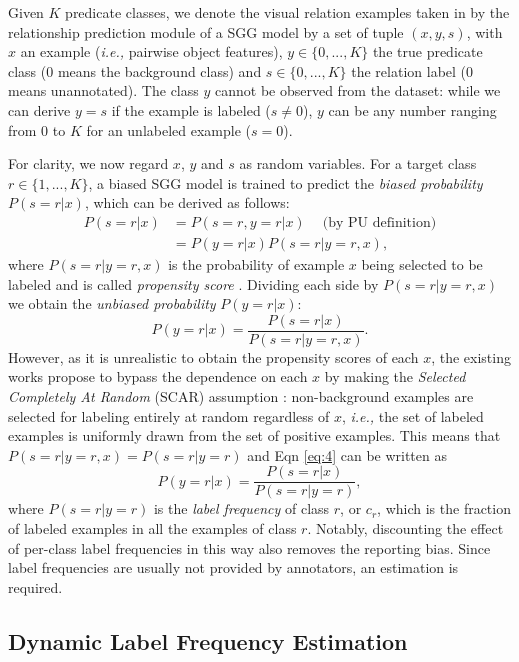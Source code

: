 \documentclass[sigconf]{acmart}
\begin{document}
Given $K$ predicate classes, we denote the visual relation examples taken in by the relationship prediction module of a SGG model by a set of tuple $(x, y, s)$, with $x$ an example (\emph{i.e.,} pairwise object features), $y \in \{0,...,K\}$ the true predicate class (0 means the background class) and $s \in \{0,...,K\}$ the relation label (0 means unannotated).
The class $y$ cannot be observed from the dataset: while we can derive $y=s$ if the example is labeled ($s \neq 0$), $y$ can be any number ranging from $0$ to $K$ for an unlabeled example ($s=0$).

For clarity, we now regard $x$, $y$ and $s$ as random variables.
For a target class $r \in \{1,...,K\}$, a biased SGG model is trained to predict the \textit{biased probability} $P(s=r|x)$, which can be derived as follows:
\begin{align}
    P(s=r|x) &= P(s=r, y=r|x) \quad \ \text{(by PU definition)} \\
             &= P(y=r|x)P(s=r|y=r,x), 
\end{align}
where $P(s=r|y=r,x)$ is the probability of example $x$ being selected to be labeled and is called \textit{propensity score} \cite{bekker2020learning}.
Dividing each side by $P(s=r|y=r,x)$ we obtain the \textit{unbiased probability} $P(y=r|x)$:
\begin{equation}
    P(y=r|x) = \frac{P(s=r|x)}{P(s=r|y=r,x)}. \label{eq:4}
\end{equation}
However, as it is unrealistic to obtain the propensity scores of each $x$, the existing works propose to \cite{elkan2008learning,chen2019soft} bypass the dependence on each $x$ by making the \textit{Selected Completely At Random} (SCAR) assumption \cite{bekker2020learning}: non-background examples are selected for labeling entirely at random regardless of $x$, \emph{i.e.,} the set of labeled examples is uniformly drawn from the set of positive examples.
This means that $P(s=r|y=r,x) = P(s=r|y=r)$ and Eqn \ref{eq:4} can be written as
\begin{equation}
    P(y=r|x) = \frac{P(s=r|x)}{P(s=r|y=r)},
\end{equation}
where $P(s=r|y=r)$ is the \textit{label frequency} of class $r$, or $c_r$, which is the fraction of labeled examples in all the examples of class $r$.
Notably, discounting the effect of per-class label frequencies in this way also removes the reporting bias.
Since label frequencies are usually not provided by annotators, an estimation is required.

\subsection{Dynamic Label Frequency Estimation}
\label{sec:dlfe}
\end{document}
